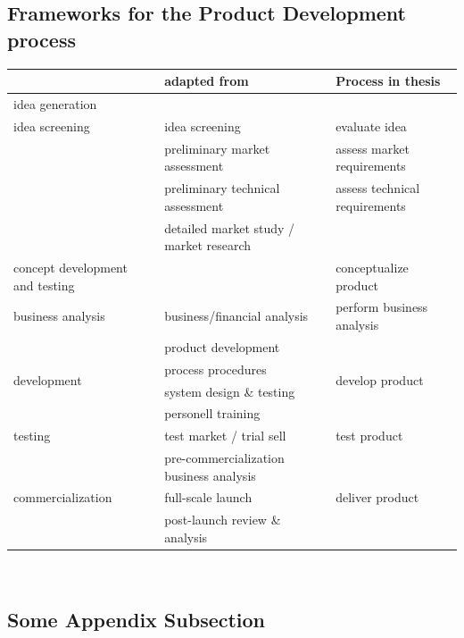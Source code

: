 \subsection{Frameworks for the Product Development process}
\label{app:pdframeworks}
\begin{table}[caption={Product Development Process Derivation}, label=tab:nsdframeworkds]
	\centering
\begin{tabular}{p{4cm}|p{5cm} |p{4.7cm}}
	\textbf{\cite{cowell1988new}} & \textbf{\cite{Edgett_1996}} adapted from \cite{cooper1988new}  & \textbf{Process in thesis}   \\ \hline \hline
	idea generation                 &                                         \\ \hline
	idea screening                  & idea screening   & evaluate idea                      \\ \hline
	& \textbullet \: preliminary market assessment     &assess market requirements    \\
	& \textbullet \: preliminary technical assessment  &assess technical requirements       \\
	& \textbullet \: detailed market study / market research \\ \hline
	concept development and testing &                       & conceptualize product                  \\ \hline
	business analysis               & business/financial analysis           & perform business analysis  \\ \hline
	\multirow{4}{*}{development}    & \textbullet \: product development      &	\multirow{4}{*}{develop product}               \\ 
	& \textbullet \: process procedures                      \\
	& \textbullet \: system design \& testing                \\
	& \textbullet \: personell training                      \\\hline
	testing                         & test market / trial sell       & test product         \\ \hline
	                      & pre-commercialization \:\:\:\:\:\:\:\:\:\:\:\:\:\:\:\:\:\:\: business analysis \\ \hline
	commercialization               & full-scale launch                   & deliver product    \\ \hline
	& post-launch review \& analysis         
\end{tabular}\\
\end{table}

\subsection{Some Appendix Subsection}

\lipsum[10]